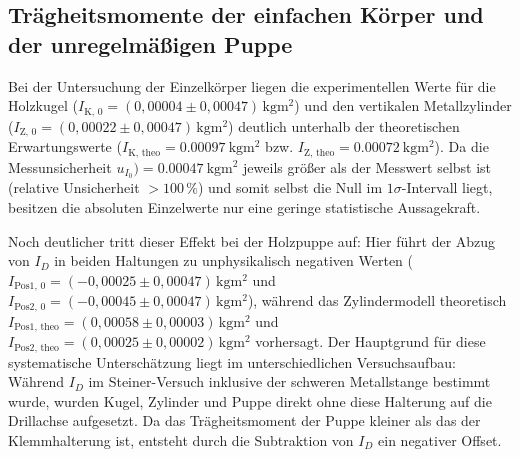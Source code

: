 \subsection{Trägheitsmomente der einfachen Körper und der unregelmäßigen Puppe}

Bei der Untersuchung der Einzelkörper liegen die experimentellen Werte für die Holzkugel ($I_{\text{K, 0}} = (0{,}00004 \pm 0{,}00047)\,\unit{\kilogram\meter\squared}$) und den vertikalen Metallzylinder ($I_{\text{Z, 0}} = (0{,}00022 \pm 0{,}00047)\,\unit{\kilogram\meter\squared}$) deutlich unterhalb der theoretischen Erwartungswerte ($I_{\text{K, theo}} = \qty{0,00097}{\kilogram\meter\squared}$ bzw. $I_{\text{Z, theo}} = \qty{0,00072}{\kilogram\meter\squared}$). Da die Messunsicherheit $u_{I_0}) = \qty{0,00047}{\kilogram\meter\squared}$ jeweils größer als der Messwert selbst ist (relative Unsicherheit $> 100\,\%$) und somit selbst die Null im $1\sigma$-Intervall liegt, besitzen die absoluten Einzelwerte nur eine geringe statistische Aussagekraft.

Noch deutlicher tritt dieser Effekt bei der Holzpuppe auf: Hier führt der Abzug von $I_D$ in beiden Haltungen zu unphysikalisch negativen Werten ($I_{\text{Pos1, 0}} = (-0{,}00025 \pm 0{,}00047)\,\unit{\kilogram\meter\squared}$ und $I_{\text{Pos2, 0}} = (-0{,}00045 \pm 0{,}00047)\,\unit{\kilogram\meter\squared}$), während das Zylindermodell theoretisch $I_{\text{Pos1, theo}} = (0{,}00058 \pm 0{,}00003)\,\unit{\kilogram\meter\squared}$ und $I_{\text{Pos2, theo}} = (0{,}00025 \pm 0{,}00002)\,\unit{\kilogram\meter\squared}$ vorhersagt. Der Hauptgrund für diese systematische Unterschätzung liegt im unterschiedlichen Versuchsaufbau: Während $I_D$ im Steiner-Versuch inklusive der schweren Metallstange bestimmt wurde, wurden Kugel, Zylinder und Puppe direkt ohne diese Halterung auf die Drillachse aufgesetzt. Da das Trägheitsmoment der Puppe kleiner als das der Klemmhalterung ist, entsteht durch die Subtraktion von $I_D$ ein negativer Offset.

